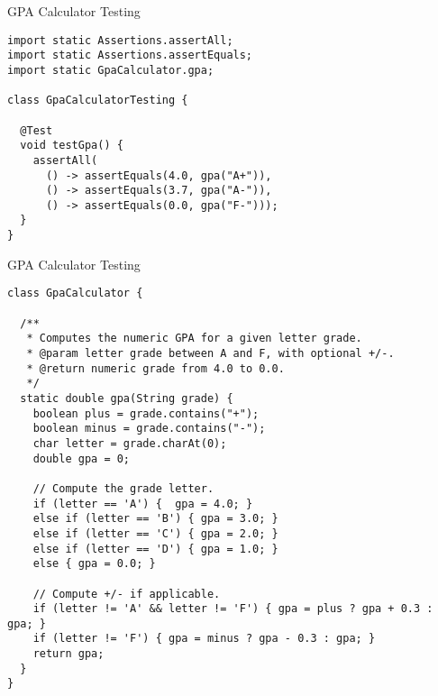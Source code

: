 
\begin{cl}[]{GPA Calculator Testing}
\begin{lstlisting}[language=MyJava]
import static Assertions.assertAll;
import static Assertions.assertEquals;
import static GpaCalculator.gpa;

class GpaCalculatorTesting {

  @Test
  void testGpa() {
    assertAll(
      () -> assertEquals(4.0, gpa("A+")),
      () -> assertEquals(3.7, gpa("A-")),
      () -> assertEquals(0.0, gpa("F-")));
  }
}
\end{lstlisting}
\end{cl}

\begin{cl}[]{GPA Calculator Testing}
\begin{lstlisting}[language=MyJava]
class GpaCalculator {

  /**
   * Computes the numeric GPA for a given letter grade.
   * @param letter grade between A and F, with optional +/-.
   * @return numeric grade from 4.0 to 0.0.
   */
  static double gpa(String grade) {
    boolean plus = grade.contains("+");
    boolean minus = grade.contains("-");
    char letter = grade.charAt(0);
    double gpa = 0;
    
    // Compute the grade letter.
    if (letter == 'A') {  gpa = 4.0; } 
    else if (letter == 'B') { gpa = 3.0; } 
    else if (letter == 'C') { gpa = 2.0; } 
    else if (letter == 'D') { gpa = 1.0; } 
    else { gpa = 0.0; }
    
    // Compute +/- if applicable.
    if (letter != 'A' && letter != 'F') { gpa = plus ? gpa + 0.3 : gpa; }
    if (letter != 'F') { gpa = minus ? gpa - 0.3 : gpa; }
    return gpa;
  }
}
\end{lstlisting}
\end{cl}

